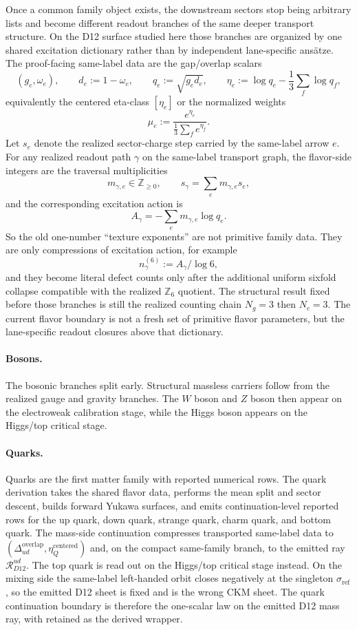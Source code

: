\documentclass[11pt]{article}
\newcommand{\ophid}[1]{\path{#1}}
\begin{document}
Once a common family object exists, the downstream sectors stop being arbitrary lists and become
different readout branches of the same deeper transport structure. On the D12 surface studied here
those branches are organized by one shared excitation dictionary rather than by independent
lane-specific ans\"atze. The proof-facing same-label data are the gap/overlap scalars
\[
(g_e,\omega_e),
\qquad
d_e:=1-\omega_e,
\qquad
q_e:=\sqrt{g_e d_e},
\qquad
\eta_e:=\log q_e-\frac13\sum_f \log q_f,
\]
equivalently the centered eta-class \([\eta_e]\) or the normalized weights
\[
\mu_e:=\frac{e^{\eta_e}}{\frac13\sum_f e^{\eta_f}}.
\]
Let \(s_e\) denote the realized sector-charge step carried by the same-label arrow \(e\). For any realized readout path \(\gamma\) on the same-label transport graph, the flavor-side integers are the traversal multiplicities
\[
m_{\gamma,e}\in\mathbb Z_{\ge0},
\qquad
s_\gamma=\sum_e m_{\gamma,e}s_e,
\]
and the corresponding excitation action is
\[
A_\gamma
=
-\sum_e m_{\gamma,e}\log q_e.
\]
So the old one-number ``texture exponents'' are not primitive family data. They are only compressions of excitation action, for example
\[
n_\gamma^{(6)}:=A_\gamma/\log 6,
\]
and they become literal defect counts only after the additional uniform sixfold collapse compatible with the realized \(\mathbb Z_6\) quotient.
The structural result fixed before those branches is still the realized counting chain \(N_g=3\)
then \(N_c=3\). The current flavor boundary is not a fresh set of primitive flavor parameters, but the
lane-specific readout closures above that dictionary.

\paragraph{Bosons.}
The bosonic branches split early. Structural massless carriers follow from the realized
gauge and gravity branches. The \(W\) boson and \(Z\) boson then appear on the electroweak
calibration stage, while the Higgs boson appears on the Higgs/top critical stage.

\paragraph{Quarks.}\label{step5-quark-family-continuation}
Quarks are the first matter family with reported numerical rows. The quark derivation
takes the shared flavor data, performs the mean split and sector descent, builds forward Yukawa
surfaces, and emits continuation-level reported rows for the up quark, down quark, strange quark,
charm quark, and bottom quark. The mass-side continuation compresses transported same-label data
to \((\Delta_{ud}^{\mathrm{overlap}},\eta_Q^{\mathrm{centered}})\) and, on the compact same-family
branch, to the emitted ray \(\mathcal R_{D12}^{ud}\). The top quark is read out on the Higgs/top
critical stage instead. On the mixing side the same-label left-handed orbit closes negatively at
the singleton \(\sigma_{\mathrm{ref}}\), so the emitted D12 sheet is fixed and is the wrong CKM
sheet. The quark continuation boundary is therefore the one-scalar law
\ophid{quark_d12_t1_value_law} on the emitted D12 mass ray, with
\ophid{intrinsic_scale_law_D12} retained as the derived wrapper.
\end{document}
